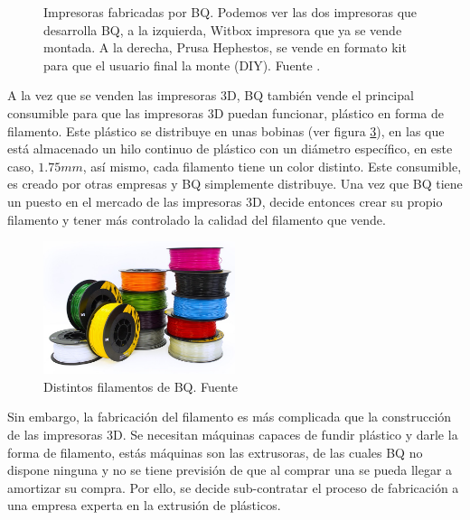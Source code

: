 \begin{figure}[H]
\begin{subfigure}[b]{0.3\textwidth}
        \label{fig:estado_hephestos}
    \end{subfigure}
    \caption[Impresoras fabricadas por BQ.]{Impresoras fabricadas por BQ. Podemos ver las dos impresoras que desarrolla BQ, a la izquierda, Witbox impresora que ya se vende montada. A la derecha, Prusa Hephestos, se vende en formato kit para que el usuario final la monte (DIY). Fuente \cite{bq}.}
    \label{fig:impresoras_bq}
\end{figure}

A la vez que se venden las impresoras 3D, BQ también vende el principal consumible para que las impresoras 3D puedan funcionar, plástico en forma de filamento. Este plástico se distribuye en unas bobinas (ver figura \ref{fig:estado_filamento}), en las que está almacenado un hilo continuo de plástico con un diámetro específico, en este caso, $1.75mm$, así mismo, cada filamento tiene un color distinto. Este consumible, es creado por otras empresas y BQ simplemente distribuye. Una vez que BQ tiene un puesto en el mercado de las impresoras 3D, decide entonces crear su propio filamento y tener más controlado la calidad del filamento que vende.\\

\begin{figure}[H]
    \centering
    \includegraphics[width=0.5\textwidth]{images/filamento_bq.png}
    \caption[Distintos filamentos de BQ.]{Distintos filamentos de BQ. Fuente \cite{bq}}
    \label{fig:estado_filamento}
\end{figure}

Sin embargo, la fabricación del filamento es más complicada que la construcción de las impresoras 3D. Se necesitan máquinas capaces de fundir plástico y darle la forma de filamento, estás máquinas son las extrusoras, de las cuales BQ no dispone ninguna y no se tiene previsión de que al comprar una se pueda llegar a amortizar su compra. Por ello, se decide sub-contratar el proceso de fabricación a una empresa experta en la extrusión de plásticos.\\

